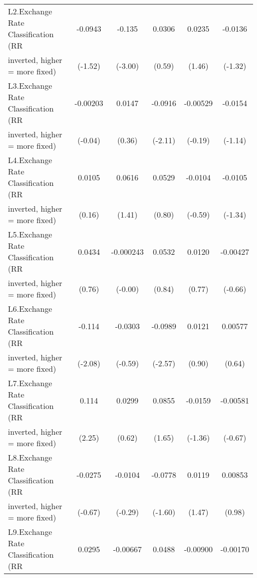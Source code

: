 {\begin{tabular}{l*{5}{c}}
\addlinespace
L2.Exchange Rate Classification (RR     &-0.0943         &-0.135\sym{**} &0.0306         &0.0235         &-0.0136         \\
inverted, higher = more fixed)          &(-1.52)         &(-3.00)         &(0.59)         &(1.46)         &(-1.32)         \\
\addlinespace
L3.Exchange Rate Classification (RR     &-0.00203         &0.0147         &-0.0916\sym{*}  &-0.00529         &-0.0154         \\
inverted, higher = more fixed)          &(-0.04)         &(0.36)         &(-2.11)         &(-0.19)         &(-1.14)         \\
\addlinespace
L4.Exchange Rate Classification (RR     &0.0105         &0.0616         &0.0529         &-0.0104         &-0.0105         \\
inverted, higher = more fixed)          &(0.16)         &(1.41)         &(0.80)         &(-0.59)         &(-1.34)         \\
\addlinespace
L5.Exchange Rate Classification (RR     &0.0434         &-0.000243         &0.0532         &0.0120         &-0.00427         \\
inverted, higher = more fixed)          &(0.76)         &(-0.00)         &(0.84)         &(0.77)         &(-0.66)         \\
\addlinespace
L6.Exchange Rate Classification (RR     &-0.114\sym{*}  &-0.0303         &-0.0989\sym{*}  &0.0121         &0.00577         \\
inverted, higher = more fixed)          &(-2.08)         &(-0.59)         &(-2.57)         &(0.90)         &(0.64)         \\
\addlinespace
L7.Exchange Rate Classification (RR     &0.114\sym{*}  &0.0299         &0.0855         &-0.0159         &-0.00581         \\
inverted, higher = more fixed)          &(2.25)         &(0.62)         &(1.65)         &(-1.36)         &(-0.67)         \\
\addlinespace
L8.Exchange Rate Classification (RR     &-0.0275         &-0.0104         &-0.0778         &0.0119         &0.00853         \\
inverted, higher = more fixed)          &(-0.67)         &(-0.29)         &(-1.60)         &(1.47)         &(0.98)         \\
\addlinespace
L9.Exchange Rate Classification (RR     &0.0295         &-0.00667         &0.0488         &-0.00900         &-0.00170         \\

\end{tabular}}
